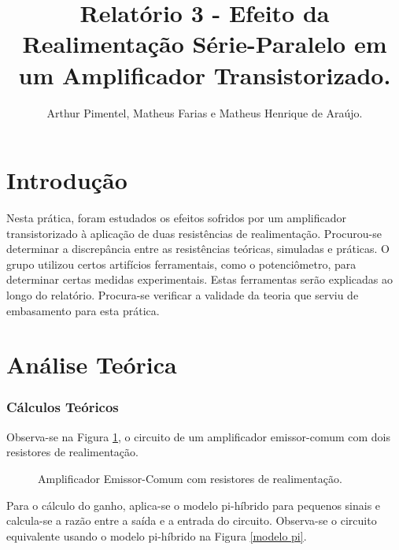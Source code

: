 \documentclass[journal, a4paper]{IEEEtran}
\begin{document}
	\title{Relatório 3 - Efeito da Realimentação Série-Paralelo em um Amplificador Transistorizado.}
	\author{Arthur Pimentel, Matheus Farias e Matheus Henrique de Araújo.

    }
	\maketitle
	\vspace{}
	
\section{Introdução}

    \tab Nesta prática, foram estudados os efeitos sofridos por um amplificador transistorizado à aplicação de duas resistências de realimentação. Procurou-se determinar a discrepância entre as resistências teóricas, simuladas e práticas. O grupo utilizou certos artifícios ferramentais, como o potenciômetro, para determinar certas medidas experimentais. Estas ferramentas serão explicadas ao longo do relatório. Procura-se verificar a validade da teoria que serviu de embasamento para esta prática.
    
\section{Análise Teórica}

    \subsubsection{Cálculos Teóricos}
    
    \tab Observa-se na Figura \ref{EM com realimentação}, o circuito de um amplificador emissor-comum com dois resistores de realimentação.
    
    
    
    \begin{figure}[H]
	
	    \hspace{-0.6 cm}	
    	
    	
	    \caption{Amplificador Emissor-Comum com resistores de realimentação.}
	    
	    \label{EM com realimentação}
    \end{figure}
    
    \tab Para o cálculo do ganho, aplica-se o modelo pi-híbrido para pequenos sinais e calcula-se a razão entre a saída e a entrada do circuito. Observa-se o circuito equivalente usando o modelo pi-híbrido na Figura \ref{modelo pi}.
        
\end{document}

